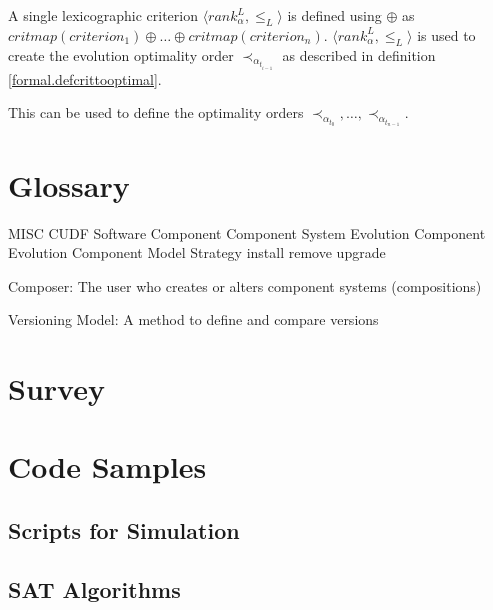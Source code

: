 A single lexicographic criterion $\langle  rank^L_{\alpha}, \leq_L \rangle$ is defined using $\oplus$ as $critmap(criterion_1) \oplus \ldots \oplus critmap(criterion_n)$.
$\langle  rank^L_{\alpha}, \leq_L \rangle$ is used to create the evolution optimality order $\prec_{\alpha_{t_{i-1}}}$ as described in definition \ref{formal.defcrittooptimal}.

This can be used to define the optimality orders $\prec_{\alpha_{t_0}},\ldots, \prec_{\alpha_{t_{n-1}}}$.


\section{Glossary}
MISC
CUDF
Software Component
Component System Evolution
Component Evolution
Component Model
Strategy
install
remove
upgrade

Composer: The user who creates or alters component systems (compositions)

Versioning Model: A method to define and compare versions

\section{Survey}
\label{apx.survey}

\section{Code Samples}
\subsection{Scripts for Simulation}
\subsection{SAT Algorithms}
